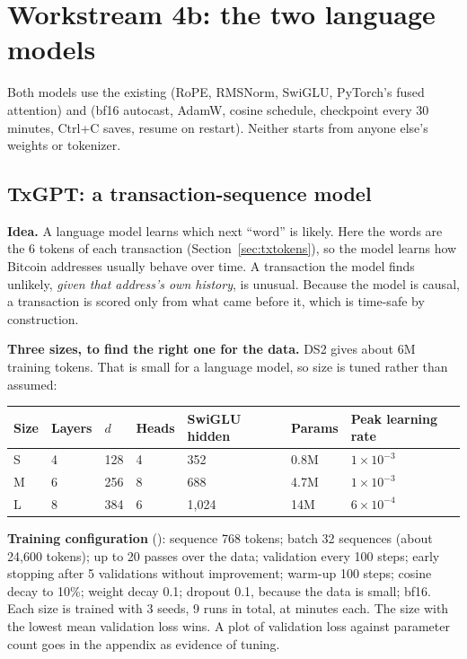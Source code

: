 \section{Workstream 4b: the two language models}
\label{sec:lm}

Both models use the existing  (RoPE, RMSNorm, SwiGLU, PyTorch's fused attention)
and  (bf16 autocast, AdamW, cosine schedule, checkpoint every 30 minutes, Ctrl+C
saves, resume on restart). Neither starts from anyone else's weights or tokenizer.

\subsection{TxGPT: a transaction-sequence model}
\label{sec:txgpt}

\textbf{Idea.} A language model learns which next ``word'' is likely. Here the words are the 6
tokens of each transaction (Section~\ref{sec:txtokens}), so the model learns how Bitcoin
addresses usually behave over time. A transaction the model finds unlikely, \emph{given that
address's own history}, is unusual. Because the model is causal, a transaction is scored only
from what came before it, which is time-safe by construction.

\textbf{Three sizes, to find the right one for the data.} DS2 gives about 6M training
tokens\est{}. That is small for a language model, so size is tuned rather than assumed:

\begin{center}
\small
\begin{tabularx}{\textwidth}{@{}L{1.5cm}C{1.3cm}C{1.3cm}C{1.3cm}C{1.8cm}C{1.9cm}Y@{}}
\toprule
\textbf{Size} & \textbf{Layers} & \textbf{$d$} & \textbf{Heads} & \textbf{SwiGLU hidden} & \textbf{Params\est{}} & \textbf{Peak learning rate} \\
\midrule
S & 4 & 128 & 4 & 352 & 0.8M & $1\times10^{-3}$ \\
M & 6 & 256 & 8 & 688 & 4.7M & $1\times10^{-3}$ \\
L & 8 & 384 & 6 & 1,024 & 14M & $6\times10^{-4}$ \\
\bottomrule
\end{tabularx}
\end{center}

\textbf{Training configuration} (): sequence 768 tokens; batch
32 sequences (about 24,600 tokens); up to 20 passes over the data; validation every 100 steps;
early stopping after 5 validations without improvement; warm-up 100 steps; cosine decay to 10\%;
weight decay 0.1; dropout 0.1, because the data is small; bf16. Each size is trained with 3 seeds,
9 runs in total, at minutes each\est{}. The size with the lowest mean validation loss wins. A
plot of validation loss against parameter count goes in the appendix as evidence of tuning.

